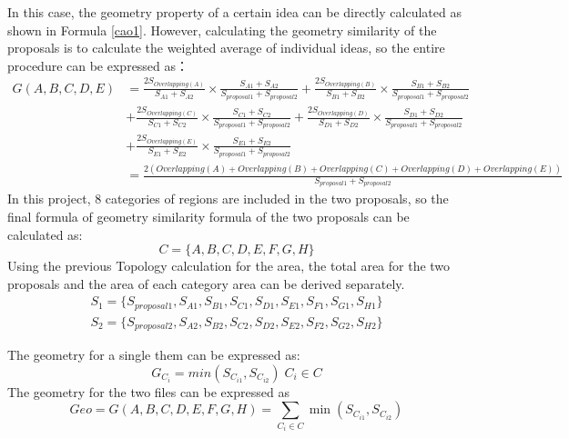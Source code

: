In this case, the geometry property of a certain idea can be directly calculated as shown in Formula \ref{cao1}. However, calculating the geometry similarity of the proposals is to calculate the weighted average of individual ideas, so the entire procedure can be expressed as：
\begin{equation}
\label{cao1}
    \begin{split}
        G(A,B,C,D,E) & =  {\frac{2S_{Overlapping(A)}}{S_{A1}+S_{A2}}} \times {\frac{S_{A1}+S_{A2}}{S_{proposal1}+S_{proposal2}}} +
        {\frac{2S_{Overlapping(B)}}{S_{B1}+S_{B2}}} \times {\frac{S_{B1}+S_{B2}}{S_{proposal1}+S_{proposal2}}}\\
        & + {\frac{2S_{Overlapping(C)}}{S_{C1}+S_{C2}}} \times {\frac{S_{C1}+S_{C2}}{S_{proposal1}+S_{proposal2}}} +
        {\frac{2S_{Overlapping(D)}}{S_{D1}+S_{D2}}} \times {\frac{S_{D1}+S_{D2}}{S_{proposal1}+S_{proposal2}}}\\
        &+ {\frac{2S_{Overlapping(E)}}{S_{E1}+S_{E2}}} \times {\frac{S_{E1}+S_{E2}}{S_{proposal1}+S_{proposal2}}}\\
        & = \frac{2(Overlapping(A)+Overlapping(B)+Overlapping(C)+Overlapping(D)+Overlapping(E))}{S_{proposal1}+S_{proposal2}}
    \end{split}
\end{equation}
In this project, 8 categories of regions are included in the two proposals, so the final formula of geometry similarity formula of the two proposals can be calculated as: 
\begin{equation}
C = \{A,B,C,D,E,F,G,H\}
\end{equation}
Using the previous Topology calculation for the area, the total area for the two proposals and the area of each category area can be derived separately.
\begin{equation}
\begin{split}
S_1=\{S_{proposal1},S_{A1},S_{B1},S_{C1},S_{D1},S_{E1},S_{F1},S_{G1},S_{H1}\}\\ 
S_2=\{S_{proposal2},S_{A2},S_{B2},S_{C2},S_{D2},S_{E2},S_{F2},S_{G2},S_{H2}\}
\end{split}
\end{equation}

The geometry for a single them can be expressed as:
\begin{equation}
G_{C_{i}}=min(S_{C_{i1}},S_{C_{i2}}) \;  C_i \in C 
\end{equation}
The geometry for the two files can be expressed as
\begin{equation}
Geo=G(A,B,C,D,E,F,G,H) =  \sum\limits_{{C_i} \in C} {\min ({S_{{C_{i1}}}},{S_{{C_{i2}}}})} 
\end{equation}

